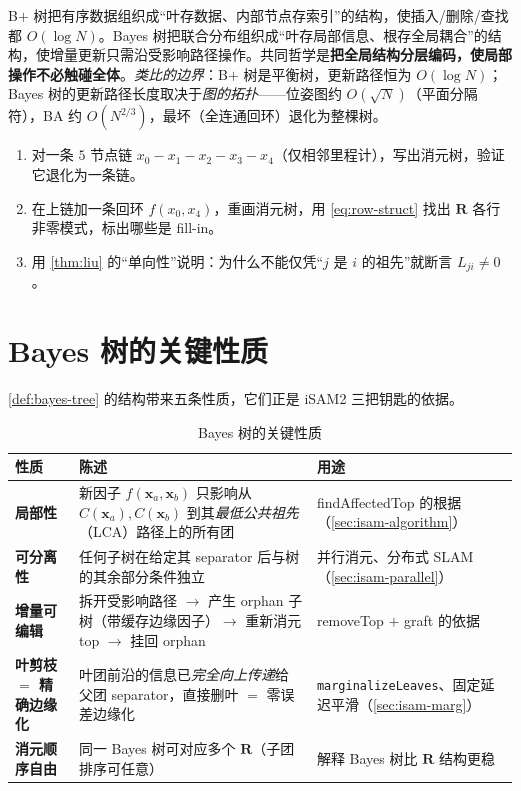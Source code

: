 \begin{insight}
B$+$ 树把有序数据组织成“叶存数据、内部节点存索引”的结构，使插入/删除/查找都 $O(\log N)$。Bayes 树把联合分布组织成“叶存局部信息、根存全局耦合”的结构，使增量更新只需沿受影响路径操作。共同哲学是\textbf{把全局结构分层编码，使局部操作不必触碰全体}。\emph{类比的边界}：B$+$ 树是平衡树，更新路径恒为 $O(\log N)$；Bayes 树的更新路径长度取决于\emph{图的拓扑}——位姿图约 $O(\sqrt N)$（平面分隔符），BA 约 $O(N^{2/3})$，最坏（全连通回环）退化为整棵树。
\end{insight}

\begin{practice}
\begin{enumerate}
  \item 对一条 $5$ 节点链 $x_0-x_1-x_2-x_3-x_4$（仅相邻里程计），写出消元树，验证它退化为一条链。
  \item 在上链加一条回环 $f(x_0,x_4)$，重画消元树，用 \cref{eq:row-struct} 找出 $\mathbf{R}$ 各行非零模式，标出哪些是 fill-in。
  \item 用 \cref{thm:liu} 的“单向性”说明：为什么不能仅凭“$j$ 是 $i$ 的祖先”就断言 $L_{ji}\neq 0$。
\end{enumerate}
\end{practice}

\section{Bayes 树的关键性质}
\label{sec:isam-properties}

\cref{def:bayes-tree} 的结构带来五条性质，它们正是 iSAM2 三把钥匙的依据。

\begin{table}[H]\centering\small
\caption{Bayes 树的关键性质}
\label{tab:bayes-tree-prop}
\begin{tabular}{p{}p{}p{}}
\toprule
性质 & 陈述 & 用途 \\
\midrule
\textbf{局部性} & 新因子 $f(\mathbf{x}_a,\mathbf{x}_b)$ 只影响从 $C(\mathbf{x}_a),C(\mathbf{x}_b)$ 到其\emph{最低公共祖先}（LCA）路径上的所有团 & findAffectedTop 的根据（\cref{sec:isam-algorithm}） \\
\textbf{可分离性} & 任何子树在给定其 separator 后与树的其余部分条件独立 & 并行消元、分布式 SLAM（\cref{sec:isam-parallel}） \\
\textbf{增量可编辑} & 拆开受影响路径 $\to$ 产生 orphan 子树（带缓存边缘因子）$\to$ 重新消元 top $\to$ 挂回 orphan & removeTop $+$ graft 的依据 \\
\textbf{叶剪枝 $=$ 精确边缘化} & 叶团前沿的信息已\emph{完全向上传递}给父团 separator，直接删叶 $=$ 零误差边缘化 & \texttt{marginalizeLeaves}、固定延迟平滑（\cref{sec:isam-marg}） \\
\textbf{消元顺序自由} & 同一 Bayes 树可对应多个 $\mathbf{R}$（子团排序可任意） & 解释 Bayes 树比 $\mathbf{R}$ 结构更稳 \\
\bottomrule
\end{tabular}
\end{table}

